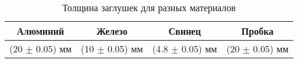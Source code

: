 \begin{table}[h!]
    \centering
    \begin{tabular}{|c|c|c|c|}
    \hline
    Алюминий            & Железо               & Свинец               & Пробка              \\ \hline
    (20 $\pm$ 0.05) мм  & (10 $\pm$ 0.05) мм   & (4.8 $\pm$ 0.05) мм  & (20 $\pm$ 0.05) мм  \\ \hline
    \end{tabular}
    \caption{Толщина заглушек для разных материалов}
    \label{tab:materials}
\end{table}